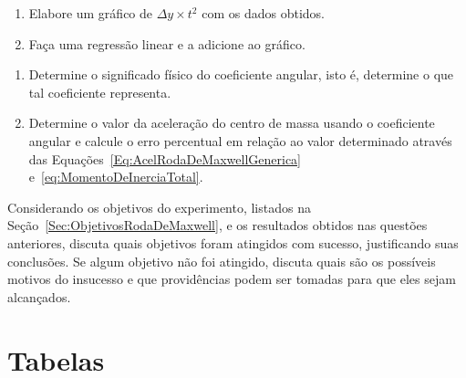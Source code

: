\begin{question}[type={exam}]{2}
\begin{enumerate}[label=\roman*.]
    \item Elabore um gráfico de $\Delta y \times t^2$ com os dados obtidos.
    \item Faça uma regressão linear e a adicione ao gráfico.
\end{enumerate}
\end{question}

\begin{question}[type={exam}]{2}
\begin{enumerate}[label=\roman*.]
    \item Determine o significado físico do coeficiente angular, isto é, determine o que tal coeficiente representa.
    \item Determine o valor da aceleração do centro de massa usando o coeficiente angular e calcule o erro percentual em relação ao valor determinado através das Equações~\eqref{Eq:AcelRodaDeMaxwellGenerica} e~\eqref{eq:MomentoDeInerciaTotal}.
\end{enumerate}
\end{question}

\begin{question}[type={exam}]{2}
Considerando os objetivos do experimento, listados na Seção~\ref{Sec:ObjetivosRodaDeMaxwell}, e os resultados obtidos nas questões anteriores, discuta quais objetivos foram atingidos com sucesso, justificando suas conclusões. Se algum objetivo não foi atingido, discuta quais são os possíveis motivos do insucesso e que providências podem ser tomadas para que eles sejam alcançados.
\end{question}

\vfill
\pagebreak
\section{Tabelas}

